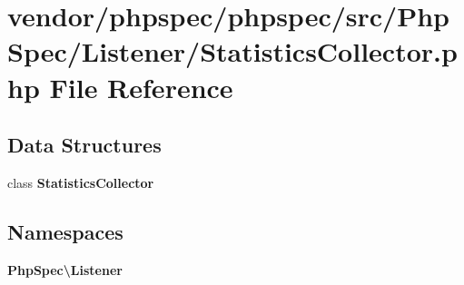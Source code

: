 \section{vendor/phpspec/phpspec/src/\+Php\+Spec/\+Listener/\+Statistics\+Collector.php File Reference}
\label{_statistics_collector_8php}
\subsection*{Data Structures}
\begin{DoxyCompactItemize}
\item 
class {\bf Statistics\+Collector}
\end{DoxyCompactItemize}
\subsection*{Namespaces}
\begin{DoxyCompactItemize}
\item 
 {\bf Php\+Spec\textbackslash{}\+Listener}
\end{DoxyCompactItemize}
